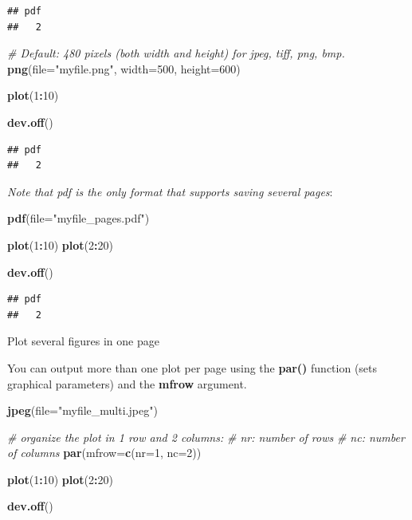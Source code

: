 \documentclass[]{book}
\newenvironment{Shaded}{\begin{snugshade}}{\end{snugshade}}
\newcommand{\CommentTok}[1]{\textcolor[rgb]{0.56,0.35,0.01}{\textit{#1}}}
\newcommand{\DataTypeTok}[1]{\textcolor[rgb]{0.13,0.29,0.53}{#1}}
\newcommand{\DecValTok}[1]{\textcolor[rgb]{0.00,0.00,0.81}{#1}}
\newcommand{\KeywordTok}[1]{\textcolor[rgb]{0.13,0.29,0.53}{\textbf{#1}}}
\newcommand{\NormalTok}[1]{#1}
\newcommand{\OperatorTok}[1]{\textcolor[rgb]{0.81,0.36,0.00}{\textbf{#1}}}
\newcommand{\StringTok}[1]{\textcolor[rgb]{0.31,0.60,0.02}{#1}}
\begin{document}
\begin{verbatim}
## pdf 
##   2
\end{verbatim}

\begin{Shaded}
\begin{Highlighting}[]
\CommentTok{# Default: 480 pixels (both width and height) for jpeg, tiff, png, bmp.}
\KeywordTok{png}\NormalTok{(}\DataTypeTok{file=}\StringTok{"myfile.png"}\NormalTok{, }\DataTypeTok{width=}\DecValTok{500}\NormalTok{, }\DataTypeTok{height=}\DecValTok{600}\NormalTok{)}

    \KeywordTok{plot}\NormalTok{(}\DecValTok{1}\OperatorTok{:}\DecValTok{10}\NormalTok{)}

\KeywordTok{dev.off}\NormalTok{()}
\end{Highlighting}
\end{Shaded}

\begin{verbatim}
## pdf 
##   2
\end{verbatim}

\emph{Note that pdf is the only format that supports saving several pages}:

\begin{Shaded}
\begin{Highlighting}[]
\KeywordTok{pdf}\NormalTok{(}\DataTypeTok{file=}\StringTok{"myfile_pages.pdf"}\NormalTok{)}

    \KeywordTok{plot}\NormalTok{(}\DecValTok{1}\OperatorTok{:}\DecValTok{10}\NormalTok{)}
    \KeywordTok{plot}\NormalTok{(}\DecValTok{2}\OperatorTok{:}\DecValTok{20}\NormalTok{)}

\KeywordTok{dev.off}\NormalTok{()}
\end{Highlighting}
\end{Shaded}

\begin{verbatim}
## pdf 
##   2
\end{verbatim}

Plot several figures in one page

You can output more than one plot per page using the \textbf{par()} function (sets graphical parameters) and the \textbf{mfrow} argument.

\begin{Shaded}
\begin{Highlighting}[]
\KeywordTok{jpeg}\NormalTok{(}\DataTypeTok{file=}\StringTok{"myfile_multi.jpeg"}\NormalTok{)}

\CommentTok{# organize the plot in 1 row and 2 columns:}
    \CommentTok{# nr: number of rows}
    \CommentTok{# nc: number of columns}
\KeywordTok{par}\NormalTok{(}\DataTypeTok{mfrow=}\KeywordTok{c}\NormalTok{(}\DataTypeTok{nr=}\DecValTok{1}\NormalTok{, }\DataTypeTok{nc=}\DecValTok{2}\NormalTok{))}

    \KeywordTok{plot}\NormalTok{(}\DecValTok{1}\OperatorTok{:}\DecValTok{10}\NormalTok{)}
    \KeywordTok{plot}\NormalTok{(}\DecValTok{2}\OperatorTok{:}\DecValTok{20}\NormalTok{)}

\KeywordTok{dev.off}\NormalTok{()}
\end{Highlighting}
\end{Shaded}
\end{document}
